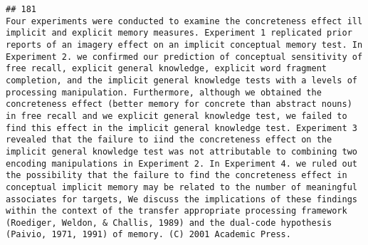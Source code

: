 \documentclass[
  english,
  man]{apa6}
\begin{document}
\begin{verbatim}
## 181                                                                                                                                                                                                                                                                                                                                                                                                                                                                                                                                                                                                                                                                                                                                                                                                                                                                                                                                                                                                                                                                                                                                                                                                                                                                                                                                 Four experiments were conducted to examine the concreteness effect ill implicit and explicit memory measures. Experiment 1 replicated prior reports of an imagery effect on an implicit conceptual memory test. In Experiment 2. we confirmed our prediction of conceptual sensitivity of free recall, explicit general knowledge, explicit word fragment completion, and the implicit general knowledge tests with a levels of processing manipulation. Furthermore, although we obtained the concreteness effect (better memory for concrete than abstract nouns) in free recall and we explicit general knowledge test, we failed to find this effect in the implicit general knowledge test. Experiment 3 revealed that the failure to iind the concreteness effect on the implicit general knowledge test was not attributable to combining two encoding manipulations in Experiment 2. In Experiment 4. we ruled out the possibility that the failure to find the concreteness effect in conceptual implicit memory may be related to the number of meaningful associates for targets, We discuss the implications of these findings within the context of the transfer appropriate processing framework (Roediger, Weldon, & Challis, 1989) and the dual-code hypothesis (Paivio, 1971, 1991) of memory. (C) 2001 Academic Press.

\end{verbatim}
\end{document}
